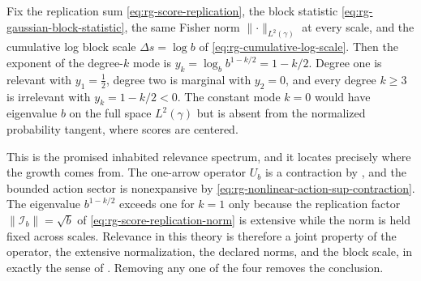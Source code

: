 Fix the replication sum \eqref{eq:rg-score-replication}, the block statistic
\eqref{eq:rg-gaussian-block-statistic}, the same Fisher norm
\(\lVert\cdot\rVert_{L^2(\gamma)}\) at every scale, and the cumulative log block
scale \(\Delta s=\log b\) of \eqref{eq:rg-cumulative-log-scale}.  Then the
exponent of the degree-\(k\) mode is
\(y_k=\log_b b^{1-k/2}=1-k/2\).  Degree one is relevant with
\(y_1=\tfrac12\), degree two is marginal with \(y_2=0\), and every degree
\(k\geq3\) is irrelevant with \(y_k=1-k/2<0\).  The constant mode
\(k=0\) would have eigenvalue \(b\) on the full space \(L^2(\gamma)\) but is
absent from the normalized probability tangent, where scores are centered.

This is the promised inhabited relevance spectrum, and it locates precisely
where the growth comes from.  The one-arrow operator \(U_b\) is a contraction by
, and the bounded action sector is
nonexpansive by \eqref{eq:rg-nonlinear-action-sup-contraction}.  The eigenvalue
\(b^{1-k/2}\) exceeds one for \(k=1\) only because the replication factor
\(\lVert\mathscr I_b\rVert=\sqrt b\) of
\eqref{eq:rg-score-replication-norm} is extensive while the norm is held fixed
across scales.  Relevance in this theory is therefore a joint property of the
operator, the extensive normalization, the declared norms, and the block scale,
in exactly the sense of .  Removing any one of the
four removes the conclusion. 

